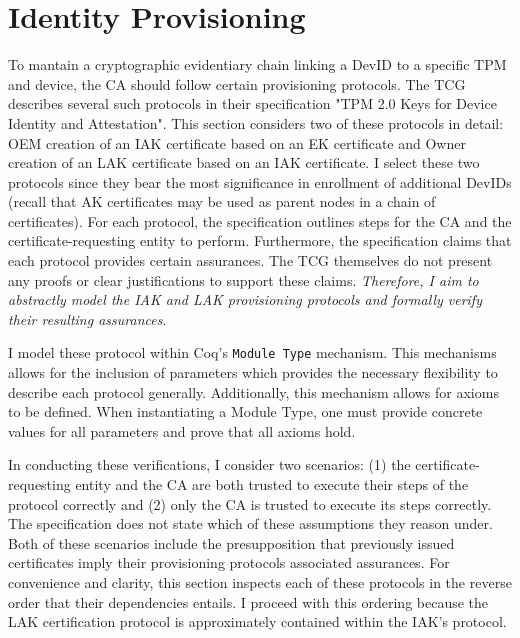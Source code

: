 \chapter{Identity Provisioning}


To mantain a cryptographic evidentiary chain linking a DevID to a specific TPM and device, the CA should follow certain provisioning protocols. The TCG describes several such protocols in their specification "TPM 2.0 Keys for Device Identity and Attestation". This section considers two of these protocols in detail: OEM creation of an IAK certificate based on an EK certificate and Owner creation of an LAK certificate based on an IAK certificate. I select these two protocols since they bear the most significance in enrollment of additional DevIDs (recall that AK certificates may be used as parent nodes in a chain of certificates). For each protocol, the specification outlines steps for the CA and the certificate-requesting entity to perform. Furthermore, the specification claims that each protocol provides certain assurances. The TCG themselves do not present any proofs or clear justifications to support these claims. 
\textit{Therefore, I aim to abstractly model the IAK and LAK provisioning protocols and formally verify their resulting assurances}.


I model these protocol within Coq's \verb|Module Type| mechanism. This mechanisms allows for the inclusion of parameters which provides the necessary flexibility to describe each protocol generally. Additionally, this mechanism allows for axioms to be defined. When instantiating a Module Type, one must provide concrete values for all parameters and prove that all axioms hold.

In conducting these verifications, I consider two scenarios: (1) the certificate-requesting entity and the CA are both trusted to execute their steps of the protocol correctly and (2) only the CA is trusted to execute its steps correctly. The specification does not state which of these assumptions they reason under. Both of these scenarios include the presupposition that previously issued certificates imply their provisioning protocols associated assurances.
For convenience and clarity, this section inspects each of these protocols in the reverse order that their dependencies entails. I proceed with this ordering because the LAK certification protocol is approximately contained within the IAK's protocol. 



